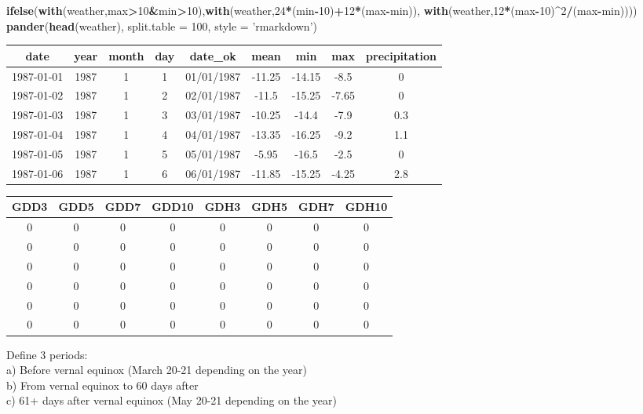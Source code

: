 \documentclass[10pt,]{article}
\newenvironment{Shaded}{\begin{snugshade}}{\end{snugshade}}
\newcommand{\KeywordTok}[1]{\textcolor[rgb]{0.13,0.29,0.53}{\textbf{#1}}}
\newcommand{\DataTypeTok}[1]{\textcolor[rgb]{0.13,0.29,0.53}{#1}}
\newcommand{\DecValTok}[1]{\textcolor[rgb]{0.00,0.00,0.81}{#1}}
\newcommand{\StringTok}[1]{\textcolor[rgb]{0.31,0.60,0.02}{#1}}
\newcommand{\OperatorTok}[1]{\textcolor[rgb]{0.81,0.36,0.00}{\textbf{#1}}}
\newcommand{\NormalTok}[1]{#1}
\begin{document}
\begin{Shaded}
\begin{Highlighting}[]
                     \KeywordTok{ifelse}\NormalTok{(}\KeywordTok{with}\NormalTok{(weather,max}\OperatorTok{>}\DecValTok{10}\OperatorTok{&}\NormalTok{min}\OperatorTok{>}\DecValTok{10}\NormalTok{),}\KeywordTok{with}\NormalTok{(weather,}\DecValTok{24}\OperatorTok{*}\NormalTok{(min}\OperatorTok{-}\DecValTok{10}\NormalTok{)}\OperatorTok{+}\DecValTok{12}\OperatorTok{*}\NormalTok{(max}\OperatorTok{-}\NormalTok{min)),}
                            \KeywordTok{with}\NormalTok{(weather,}\DecValTok{12}\OperatorTok{*}\NormalTok{(max}\OperatorTok{-}\DecValTok{10}\NormalTok{)}\OperatorTok{^}\DecValTok{2}\OperatorTok{/}\NormalTok{(max}\OperatorTok{-}\NormalTok{min))))}
\KeywordTok{pander}\NormalTok{(}\KeywordTok{head}\NormalTok{(weather), }\DataTypeTok{split.table =} \DecValTok{100}\NormalTok{, }\DataTypeTok{style =} \StringTok{'rmarkdown'}\NormalTok{)}
\end{Highlighting}
\end{Shaded}

\begin{longtable}[]{@{}ccccccccc@{}}
\toprule
date & year & month & day & date\_ok & mean & min & max &
precipitation\tabularnewline
\midrule
\endhead
1987-01-01 & 1987 & 1 & 1 & 01/01/1987 & -11.25 & -14.15 & -8.5 &
0\tabularnewline
1987-01-02 & 1987 & 1 & 2 & 02/01/1987 & -11.5 & -15.25 & -7.65 &
0\tabularnewline
1987-01-03 & 1987 & 1 & 3 & 03/01/1987 & -10.25 & -14.4 & -7.9 &
0.3\tabularnewline
1987-01-04 & 1987 & 1 & 4 & 04/01/1987 & -13.35 & -16.25 & -9.2 &
1.1\tabularnewline
1987-01-05 & 1987 & 1 & 5 & 05/01/1987 & -5.95 & -16.5 & -2.5 &
0\tabularnewline
1987-01-06 & 1987 & 1 & 6 & 06/01/1987 & -11.85 & -15.25 & -4.25 &
2.8\tabularnewline
\bottomrule
\end{longtable}

\begin{longtable}[]{@{}cccccccc@{}}
\toprule
GDD3 & GDD5 & GDD7 & GDD10 & GDH3 & GDH5 & GDH7 & GDH10\tabularnewline
\midrule
\endhead
0 & 0 & 0 & 0 & 0 & 0 & 0 & 0\tabularnewline
0 & 0 & 0 & 0 & 0 & 0 & 0 & 0\tabularnewline
0 & 0 & 0 & 0 & 0 & 0 & 0 & 0\tabularnewline
0 & 0 & 0 & 0 & 0 & 0 & 0 & 0\tabularnewline
0 & 0 & 0 & 0 & 0 & 0 & 0 & 0\tabularnewline
0 & 0 & 0 & 0 & 0 & 0 & 0 & 0\tabularnewline
\bottomrule
\end{longtable}

Define 3 periods:\\
a) Before vernal equinox (March 20-21 depending on the year)\\
b) From vernal equinox to 60 days after\\
c) 61+ days after vernal equinox (May 20-21 depending on the year)
\end{document}

